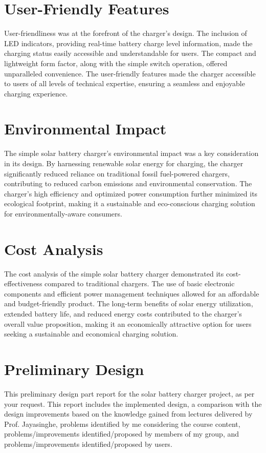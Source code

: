 \documentclass[twocolumn]{article}
\begin{document}
\section*{User-Friendly Features}

User-friendliness was at the forefront of the charger's design. The inclusion of LED indicators, providing real-time battery charge level information, made the charging status easily accessible and understandable for users. The compact and lightweight form factor, along with the simple switch operation, offered unparalleled convenience. The user-friendly features made the charger accessible to users of all levels of technical expertise, ensuring a seamless and enjoyable charging experience.

\section*{Environmental Impact}

The simple solar battery charger's environmental impact was a key consideration in its design. By harnessing renewable solar energy for charging, the charger significantly reduced reliance on traditional fossil fuel-powered chargers, contributing to reduced carbon emissions and environmental conservation. The charger's high efficiency and optimized power consumption further minimized its ecological footprint, making it a sustainable and eco-conscious charging solution for environmentally-aware consumers.

\section*{Cost Analysis}

The cost analysis of the simple solar battery charger demonstrated its cost-effectiveness compared to traditional chargers. The use of basic electronic components and efficient power management techniques allowed for an affordable and budget-friendly product. The long-term benefits of solar energy utilization, extended battery life, and reduced energy costs contributed to the charger's overall value proposition, making it an economically attractive option for users seeking a sustainable and economical charging solution.


\section*{Preliminary Design}
This preliminary design part report for the solar battery charger project, as per your request. This report includes the implemented design, a comparison with the design improvements based on the knowledge gained from lectures delivered by Prof. Jayasinghe, problems identified by me considering the course content, problems/improvements identified/proposed by members of my group, and problems/improvements identified/proposed by users.
\end{document}
